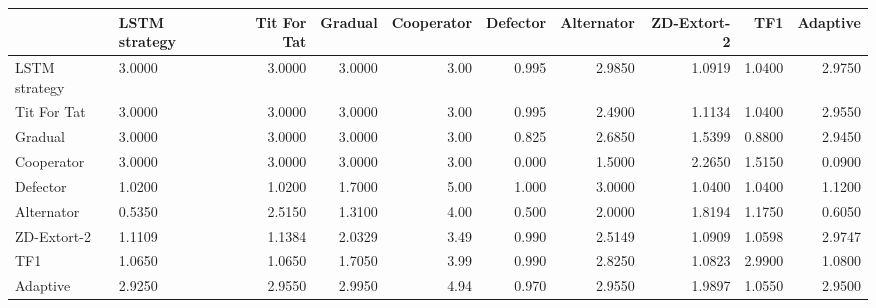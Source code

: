 \begin{tabular}{lgrrrrrrrr}
\toprule
{} &  LSTM strategy &  Tit For Tat &  Gradual &  Cooperator &  Defector &  Alternator &  ZD-Extort-2 &     TF1 &  Adaptive \\
\midrule
{}
LSTM strategy &         3.0000 &       3.0000 &   3.0000 &        3.00 &     0.995 &      2.9850 &       1.0919 &  1.0400 &    2.9750 \\
Tit For Tat   &         3.0000 &       3.0000 &   3.0000 &        3.00 &     0.995 &      2.4900 &       1.1134 &  1.0400 &    2.9550 \\
Gradual       &         3.0000 &       3.0000 &   3.0000 &        3.00 &     0.825 &      2.6850 &       1.5399 &  0.8800 &    2.9450 \\
Cooperator    &         3.0000 &       3.0000 &   3.0000 &        3.00 &     0.000 &      1.5000 &       2.2650 &  1.5150 &    0.0900 \\
Defector      &         1.0200 &       1.0200 &   1.7000 &        5.00 &     1.000 &      3.0000 &       1.0400 &  1.0400 &    1.1200 \\
Alternator    &         0.5350 &       2.5150 &   1.3100 &        4.00 &     0.500 &      2.0000 &       1.8194 &  1.1750 &    0.6050 \\
ZD-Extort-2   &         1.1109 &       1.1384 &   2.0329 &        3.49 &     0.990 &      2.5149 &       1.0909 &  1.0598 &    2.9747 \\
TF1           &         1.0650 &       1.0650 &   1.7050 &        3.99 &     0.990 &      2.8250 &       1.0823 &  2.9900 &    1.0800 \\
Adaptive      &         2.9250 &       2.9550 &   2.9950 &        4.94 &     0.970 &      2.9550 &       1.9897 &  1.0550 &    2.9500 \\
\bottomrule
\end{tabular}
